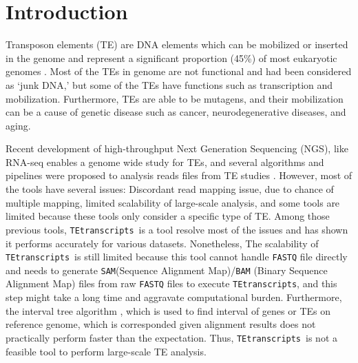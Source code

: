 \documentclass{ws-procs11x85}
\newcommand{\TEtranscripts}{\texttt{TEtranscripts}}
\begin{document}

\bodymatter

\section{Introduction}\label{aba:intro}

Transposon elements (TE) are DNA elements which can be mobilized or inserted in the genome and represent a significant proportion (45\%) of most eukaryotic genomes \cite{erwin2014mobile}. 
Most of the TEs in genome are not functional and had been considered as `junk DNA,' but some of the TEs have functions such as transcription and mobilization.\cite{biemont2006genetics}
Furthermore, TEs are able to be mutagens, and their mobilization can be a cause of genetic disease \cite{belancio2008mammalian} such as cancer,
\cite{jirtle2007environmental}
neurodegenerative diseases,\cite{erwin2014mobile} and aging.\cite{wood2013chromatin} %

Recent development of high-throughput Next Generation Sequencing (NGS), like RNA-seq
enables a genome wide study for TEs\cite{ohtani2013dmgtsf1,mihevc2016tdp,li2012transposable,krug2017retrotransposon}, and several algorithms and pipelines were proposed to analysis reads files from TE studies \cite{lee2012landscape,platzer2012te,helman2014somatic,henaff2015jitterbug,jin2015tetranscripts,de2017identifying}. However, most of the tools have several issues: Discordant read mapping issue, due to chance of multiple mapping, limited scalability of large-scale analysis, and some tools are limited because these tools only consider a specific type of TE.
\cite{ewing2015transposable} 
Among those previous tools, \TEtranscripts~is a tool resolve most of the issues and has shown it performs accurately for various datasets.
\cite{jin2015tetranscripts}
Nonetheless, The scalability of \TEtranscripts~is still limited because this tool cannot handle \verb|FASTQ| file directly and needs to generate \verb|SAM|(Sequence Alignment Map)/\verb|BAM| (Binary Sequence Alignment Map) files from raw \verb|FASTQ| files to execute \TEtranscripts, and this step might take a long time and aggravate computational burden.
Furthermore, the interval tree algorithm \cite{samet1990design}, which is used to find interval of genes or TEs on reference genome, which is corresponded given alignment results does not practically perform faster than the expectation. Thus, \TEtranscripts~is not a feasible tool to perform large-scale TE analysis.
\end{document}
